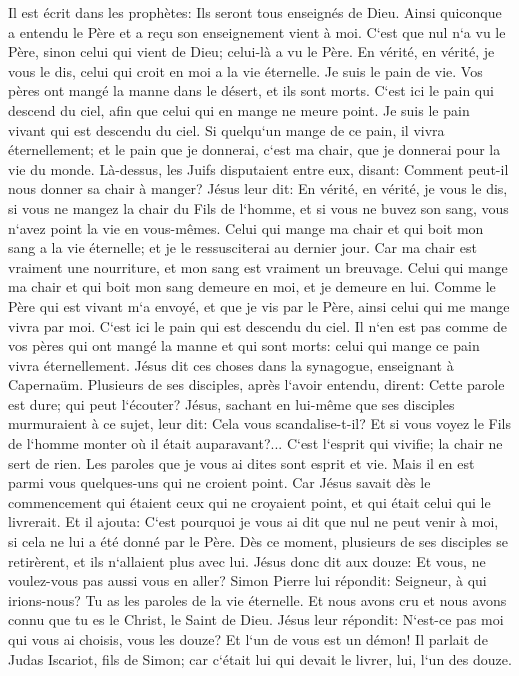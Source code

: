 \verse Il est écrit dans les prophètes: Ils seront tous enseignés de Dieu. Ainsi quiconque a entendu le Père et a reçu son enseignement vient à moi. 
\verse C`est que nul n`a vu le Père, sinon celui qui vient de Dieu; celui-là a vu le Père. 
\verse En vérité, en vérité, je vous le dis, celui qui croit en moi a la vie éternelle. 
\verse Je suis le pain de vie. 
\verse Vos pères ont mangé la manne dans le désert, et ils sont morts. 
\verse C`est ici le pain qui descend du ciel, afin que celui qui en mange ne meure point. 
\verse Je suis le pain vivant qui est descendu du ciel. Si quelqu`un mange de ce pain, il vivra éternellement; et le pain que je donnerai, c`est ma chair, que je donnerai pour la vie du monde. 
\verse Là-dessus, les Juifs disputaient entre eux, disant: Comment peut-il nous donner sa chair à manger? 
\verse Jésus leur dit: En vérité, en vérité, je vous le dis, si vous ne mangez la chair du Fils de l`homme, et si vous ne buvez son sang, vous n`avez point la vie en vous-mêmes. 
\verse Celui qui mange ma chair et qui boit mon sang a la vie éternelle; et je le ressusciterai au dernier jour. 
\verse Car ma chair est vraiment une nourriture, et mon sang est vraiment un breuvage. 
\verse Celui qui mange ma chair et qui boit mon sang demeure en moi, et je demeure en lui. 
\verse Comme le Père qui est vivant m`a envoyé, et que je vis par le Père, ainsi celui qui me mange vivra par moi. 
\verse C`est ici le pain qui est descendu du ciel. Il n`en est pas comme de vos pères qui ont mangé la manne et qui sont morts: celui qui mange ce pain vivra éternellement. 
\verse Jésus dit ces choses dans la synagogue, enseignant à Capernaüm. 
\verse Plusieurs de ses disciples, après l`avoir entendu, dirent: Cette parole est dure; qui peut l`écouter? 
\verse Jésus, sachant en lui-même que ses disciples murmuraient à ce sujet, leur dit: Cela vous scandalise-t-il? 
\verse Et si vous voyez le Fils de l`homme monter où il était auparavant?... 
\verse C`est l`esprit qui vivifie; la chair ne sert de rien. Les paroles que je vous ai dites sont esprit et vie. 
\verse Mais il en est parmi vous quelques-uns qui ne croient point. Car Jésus savait dès le commencement qui étaient ceux qui ne croyaient point, et qui était celui qui le livrerait. 
\verse Et il ajouta: C`est pourquoi je vous ai dit que nul ne peut venir à moi, si cela ne lui a été donné par le Père. 
\verse Dès ce moment, plusieurs de ses disciples se retirèrent, et ils n`allaient plus avec lui. 
\verse Jésus donc dit aux douze: Et vous, ne voulez-vous pas aussi vous en aller? 
\verse Simon Pierre lui répondit: Seigneur, à qui irions-nous? Tu as les paroles de la vie éternelle. 
\verse Et nous avons cru et nous avons connu que tu es le Christ, le Saint de Dieu. 
\verse Jésus leur répondit: N`est-ce pas moi qui vous ai choisis, vous les douze? Et l`un de vous est un démon! 
\verse Il parlait de Judas Iscariot, fils de Simon; car c`était lui qui devait le livrer, lui, l`un des douze. 

